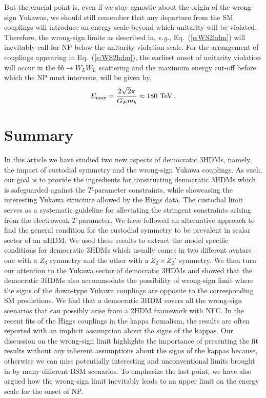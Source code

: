 \documentclass[11pt]{article}
\def\bar{\overline}
\def\Eqn#1{Eq.\ (\ref{#1})}
\begin{document}
But the crucial point is, even if we stay agnostic about the origin of the wrong-sign
Yukawas, we should still remember that any departure from the SM couplings will introduce
an energy scale beyond which unitarity will be violated\cite{Joglekar:1973hh}. Therefore, the wrong-sign limits
as described in, {\it e.g.}, \Eqn{e:WS2hdm} will inevitably call for NP below the unitarity
violation scale. For the arrangement of couplings appearing in \Eqn{e:WS2hdm},
the earliest onset of unitarity violation will occur in the $b\bar{b}\to W_LW_L$
scattering and the maximum energy cut-off before which the NP must intervene,
will be given by\cite{Bhattacharyya:2012tj},
%
\begin{eqnarray}
	E_{\rm max} = \frac{2\sqrt{2}\pi}{G_F m_b} \approx 180~{\rm TeV} \,.
\end{eqnarray}


%
\section{Summary}
\label{s:summary}
%
In this article we have studied two new aspects of democratic 3HDMs, namely, the
impact of custodial symmetry and the wrong-sign Yukawa couplings.
As such, our goal is to provide the ingredients for constructing democratic 3HDMs 
which is safeguarded against the $T$-parameter constraints, while showcasing 
the interesting Yukawa structure allowed by the Higgs data.
 The custodial
limit serves as a systematic guideline for alleviating the stringent constraints
arising from the electroweak \mbox{$T$-parameter}. We have followed an alternative approach
to find the general condition for the custodial symmetry to be prevalent in
scalar sector of an nHDM. We used these results to extract the model specific
conditions for democratic 3HDMs which usually comes in two different avatars --
one with a $Z_3$ symmetry and the other with a $Z_2\times Z_2'$ symmetry.
%
We then turn our attention to the Yukawa sector of democratic 3HDMs and showed
that the democratic 3HDMs also accommodate the possibility of wrong-sign limit
where the signs of the down-type Yukawa couplings are opposite to the corresponding
SM predictions. We find that a democratic 3HDM covers all the wrong-sign scenarios
that can possibly arise from a 2HDM framework with NFC. In the recent fits of the
Higgs couplings\cite{ATLAS:2021vrm,ATLAS:2019nkf, CMS:2020eni} in the kappa formalism\cite{LHCHiggsCrossSectionWorkingGroup:2012nn, LHCHiggsCrossSectionWorkingGroup:2013rie}, the results are
often reported with an implicit assumption about the signs of the kappas. Our
discussion on the wrong-sign limit highlights the importance of presenting the
fit results without any inherent assumptions about the signs of the kappas because,
otherwise we can miss potentially interesting and unconventional limits brought
in by many different BSM scenarios. To emphasize the last point, we have also argued
how the wrong-sign limit inevitably leads to an upper limit on the energy scale
for the onset of NP.  
\end{document}
